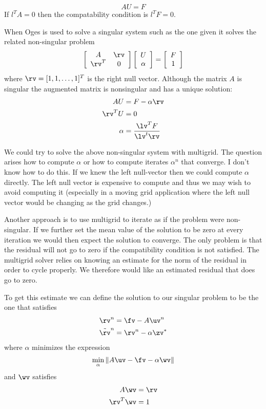\documentclass{article}
\begin{document}
$$
    A U = F 
$$
If $l^T A =0$ then the compatability condition is $l^TF=0$. 

     
When Oges is used to solve a singular system such as the one given
it solves the related non-singular problem
\begin{equation} \label{aug}
   \left[ \begin{array}{cc}
            A  & \rv  \\
          \rv^T &  0
           \end{array}\right]
   \left[ \begin{array}{c} U \\ \alpha  \end{array}\right]
 = \left[ \begin{array}{c} F \\ 1  \end{array}\right]
\end{equation}
where $\rv=[1,1,\ldots,1]^T$ is the right null vector.
Although the matrix $A$ is singular the augmented matrix
is nonsingular and has a unique solution:
\begin{align*}
   A U &= F - \alpha \rv \\
   \rv^T U &=0 \\
 \alpha &= { \lv^T F \over \lv^t\rv } 
\end{align*}


We could try to solve the above non-singular system with multigrid. The
question arises how to compute $\alpha$ or how to compute iterates
$\alpha^n$ that converge. I don't know how to do this. 
If we knew the left null-vector then we could compute $\alpha$ directly.
The left null vector is expensive to compute and thus we may wish to avoid
computing it (especially in a moving grid application where the left null
vector would be changing as the grid changes.)

Another approach is to use multigrid to iterate as if the problem were
non-singular. If we further set the mean value of the solution to 
be zero at every iteration we would then expect the solution to 
converge. The only problem is that the residual will not go to
zero if the compatibility condition is not satisfied. 
The multigrid solver relies on knowing an estimate for the
norm of the residual in order to cycle properly. We therefore
would like an estimated residual that does go to zero. 

To get this estimate we can define the solution to our singular problem
to be the one that satisfies
\begin{align*}
    \rv^n & = \fv - A \uv^n \\    
    \tilde{\rv}^n &= \rv^n -\alpha \zv^*
\end{align*}
where $\alpha$ minimizes the expression
\[
    \min_\alpha \| A \uv - \fv - \alpha \wv \|
\]
and $\wv$ satisfies
\begin{align*}
     A \wv &= \rv \\
     \rv^T \wv &= 1
\end{align*}
\end{document}
